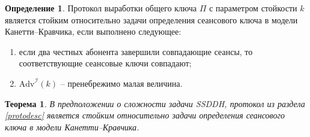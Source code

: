 \documentclass[a4paper,12pt]{article}
\newtheorem{theorem}{Теорема}
\theoremstyle{definition}
\newtheorem{definition}{Определение}
\begin{document}
\begin{definition}\label{defstoi}
 Протокол выработки общего ключа $\Pi$ с параметром стойкости $k$ является стойким относительно задачи определения сеансового ключа в модели Канетти--Кравчика, если выполнено следующее:
 \begin{enumerate} 
  \item если два честных абонента завершили совпадающие сеансы, то соответствующие сеансовые ключи совпадают; 
  \item $\mathrm{Adv}^{\mathcal{I}}(k)$ -- пренебрежимо малая величина.
 \end{enumerate}

\end{definition}

\begin{theorem} В предположении о сложности задачи SSDDH, протокол из раздела \ref{protodesc} является стойким относительно задачи определения сеансового ключа в модели Канетти--Кравчика.
 \end{theorem}
\end{document}
